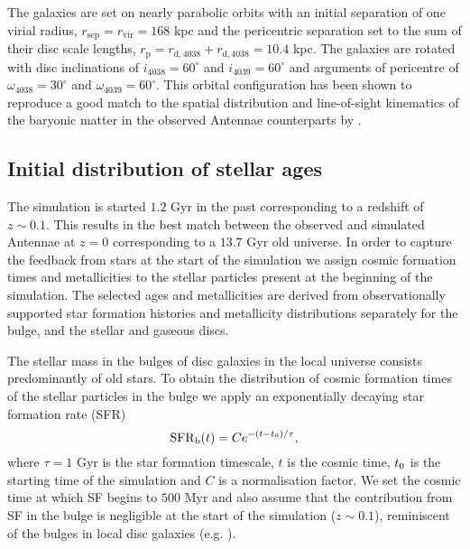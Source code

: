 \documentclass[a4paper,fleqn,usenatbib]{mnras}
\begin{document}
The galaxies are set on nearly parabolic orbits with an initial separation of one 
virial radius, $r_\mathrm{sep}=r_\mathrm{vir}=168$ kpc and the pericentric 
separation set to the sum of their disc scale lengths, 
$r_\mathrm{p}=r_\mathrm{d,4038}+r_\mathrm{d,4038}=10.4$ kpc. The galaxies are 
rotated with disc inclinations of $i_{4038}=60^{\circ}$ and $i_{4039}=60^{\circ}$ 
and arguments of pericentre of $\omega_{4038}=30^{\circ}$ and 
$\omega_{4039}=60^{\circ}$. This orbital configuration has been shown to reproduce a good match to 
the spatial distribution and line-of-sight kinematics of the baryonic matter in 
the observed Antennae counterparts by \citet{2010ApJ...715L..88K}.


\subsection{Initial distribution of stellar ages}\label{section:age_description}

The simulation is started $1.2$ Gyr in the past corresponding to a redshift of $z\sim0.1$. 
This results in the best match between the observed and 
simulated Antennae at $z=0$ corresponding to a $13.7$ Gyr old universe.
In order to capture the feedback from stars at 
the start of the simulation we assign cosmic formation times and 
metallicities to the stellar particles present at the beginning of the simulation.
The selected ages and metallicities are derived from observationally supported 
star formation histories and metallicity distributions separately for the bulge, and the 
stellar and gaseous discs. 

The stellar mass in the bulges of disc galaxies in the local universe consists predominantly 
of old stars.
To obtain the distribution of cosmic formation times of the 
stellar particles in the bulge we apply an exponentially decaying star 
formation rate (SFR)
\begin{equation}
 \mathrm{SFR}_\mathrm{b}(t) = C e^{-(t-t_{\rm{0}})/\tau},
\end{equation}
where $\tau=1$ Gyr is the star formation timescale, $t$ is the cosmic time, $t_{\rm{0}}$ is the starting time of the simulation
and $C$ is a normalisation factor. We set the cosmic time at which SF begins to $500$ Myr and also assume 
that the contribution from SF in the bulge is negligible at the start of the simulation ($z\sim0.1$), reminiscent of the bulges in local disc galaxies 
(e.g. \citealt{2017A&A...597A..97M}).
\end{document}
